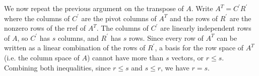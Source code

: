 We now repeat the previous argument on the transpose of $A$. Write $A^T = C^\prime R^\prime$ where the columns of $C^\prime$ are the pivot columns of $A^T$ and the rows of $R^\prime$ are the nonzero rows of the rref of $A^T$. The columns of $C^\prime$ are linearly independent rows of $A$, so $C^\prime$ has $s$ columns, and $R^\prime$ has $s$ rows. Since every row of $A^T$ can be written as a linear combination of the rows of $R^\prime$, a basis for the row space of $A^T$ (i.e. the column space of $A$) cannot have more than $s$ vectors, or $r\leq s$. Combining both inequalities, since $r\leq s$ and $s\leq r$, we have $r=s$.

%
%


